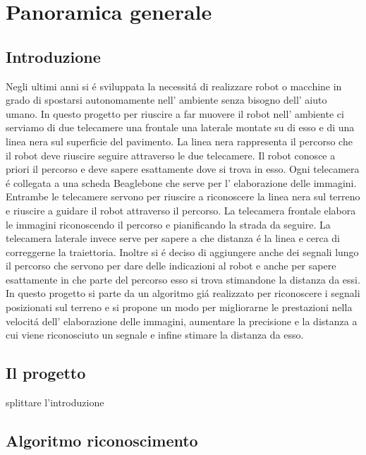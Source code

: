 \chapter{Panoramica generale}

\section{Introduzione}

\cite{Pan}

	Negli ultimi anni si \'e sviluppata la necessit\'a di realizzare robot o macchine in grado di spostarsi autonomamente nell' ambiente senza bisogno dell' aiuto umano.
	In questo progetto per riuscire a far muovere il robot nell' ambiente ci serviamo di due telecamere una frontale una laterale montate su di esso e di una linea nera sul superficie del pavimento.
	La linea nera rappresenta il percorso che il robot deve riuscire seguire attraverso le due telecamere. Il robot conosce a priori il percorso e deve sapere esattamente dove si trova in esso. Ogni telecamera \'e collegata a una scheda Beaglebone che serve per l' elaborazione delle immagini. Entrambe le telecamere servono per riuscire a riconoscere la linea nera sul terreno e riuscire a guidare il robot attraverso il percorso. La telecamera frontale elabora le immagini riconoscendo il percorso e pianificando la strada da seguire. La telecamera laterale invece serve per sapere a che distanza \'e la linea e cerca di correggerne la traiettoria.
	Inoltre si \'e deciso di aggiungere anche dei segnali lungo il percorso che servono per dare delle indicazioni al robot e anche per sapere esattamente in che parte del percorso esso si trova stimandone la distanza da essi.
	In questo progetto si parte da un algoritmo gi\'a realizzato per riconoscere i segnali posizionati sul terreno e si propone un modo per migliorarne le prestazioni nella velocit\'a dell' elaborazione delle immagini, aumentare la precisione e la distanza a cui viene riconosciuto un segnale e infine stimare la distanza da esso.

\section{Il progetto}
	splittare l'introduzione

\section{Algoritmo riconoscimento}

